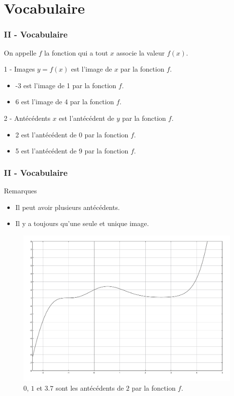 \documentclass{beamer}
\begin{document}
\section{Vocabulaire}

\begin{frame}
  \frametitle{II - Vocabulaire}

  \begin{block}{}	
    On appelle $f$ la fonction qui a tout $x$ associe la valeur $f(x)$.
  \end{block}

  \begin{alertblock}{1 - Images}
    $y = f(x)$ est l'image de $x$ par la fonction $f$.
    \begin{itemize}
    \item -3 est l'image de 1 par la fonction $f$.\\
    \item 6 est l'image de 4 par la fonction $f$.
    \end{itemize}
  \end{alertblock}

  \begin{alertblock}{2 - Antécédents}
    $x$ est l'antécédent de $y$ par la fonction $f$.
    \begin{itemize}
    \item 2 est l'antécédent de 0 par la fonction $f$.\\
    \item 5 est l'antécédent de 9 par la fonction $f$.
    \end{itemize}
  \end{alertblock}

\end{frame}


\begin{frame}
  \frametitle{II - Vocabulaire}

  \begin{exampleblock}{Remarques}
    \begin{itemize}
    \item Il peut avoir plusieurs antécédents.
    \item Il y a toujours qu'une seule et unique image.
    \end{itemize}
  \end{exampleblock}

  \begin{figure}[H]
    \centering
    \includegraphics[width=0.56\linewidth]{sources/cours/courbe.pdf}
    \caption{$0$, $1$ et $3.7$ sont les antécédents de $2$ par la fonction $f$.}
  \end{figure}

\end{frame}
\end{document}
